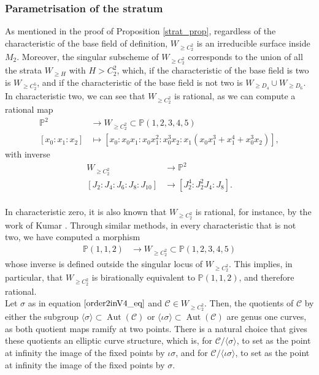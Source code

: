 \documentclass{amsart}
\newcommand{\calC}{\mathcal{C}}
\DeclareMathOperator{\Aut}{Aut}
\numberwithin{equation}{section}
\theoremstyle{definition}
\theoremstyle{remark}
\begin{document}
\subsubsection{Parametrisation of the stratum} \label{par_subsection}
As mentioned in the proof of Proposition \ref{strat_prop}, regardless of the characteristic of the base field of definition, $W_{\geq C_2^2}$ is an irreducible surface inside $M_2$. Moreover, the singular subscheme of $W_{\geq C_2^2}$ corresponds to the union of all the strata $W_{\geq     H}$ with $H> C_2^2$, which, if the characteristic of the base field is two is $W_{\geq C_2^5}$, and if the characteristic of the base field is not two is $W_{\geq D_4}\cup W_{\geq D_6}$.\\

In characteristic two, we can see that $W_{\geq C_2^2}$ is rational, as we can compute a rational map
\begin{align*}
\mathbb{P}^2&\longrightarrow W_{\geq C_2^2}\subset\mathbb{P}(1,2,3,4,5)\\
[x_0:x_1:x_2]&\longmapsto[x_0:x_0 x_1:x_0 x_1^2: x_0^3x_2:x_1(x_0x_1^3 + x_1^4 + x_0^3x_2)],
\end{align*}
with inverse
\begin{align*}
W_{\geq C_2^2}&\longrightarrow \mathbb{P}^2\\
[J_2:J_4:J_6:J_8:J_{10}]&\longrightarrow [J_2^4:J_2^2J_4:J_8].\\
\end{align*}

In characteristic zero, it is also known that $W_{\geq C_2^2}$ is rational, for instance, by the work of Kumar \cite{Kumar2015HilbertFields}. Through similar methods, in every characteristic that is not two, we have computed a morphism
\begin{align*}
\mathbb{P}
(1,1,2)&\longrightarrow W_{\geq C_2^2}\subset\mathbb{P}(1,2,3,4,5)
\end{align*}
whose inverse is defined outside the singular locus of $W_{\geq C_2^2}$. This implies, in particular, that $W_{\geq C_2^2}$ is birationally equivalent to $\mathbb{P}
(1,1,2)$, and therefore rational.\\

Let $\sigma$ as in equation $\ref{order2inV4_eq}$ and $\calC\in W_{\geq C_2^2}$. Then, the quotients of $\calC$ by either the subgroup $\langle \sigma\rangle\subset\Aut(\calC)$ or  $\langle \iota \sigma\rangle\subset\Aut(\calC)$ are genus one curves, as both quotient maps ramify at two points. There is a natural choice that gives these quotients an elliptic curve structure, which is, for $\calC/\langle \sigma\rangle$, to set as the point at infinity the image of the fixed points by $\iota\sigma$, and for $\calC/\langle \iota\sigma\rangle$, to set as the point at infinity the image of the fixed points by $\sigma$. \\
\end{document}
